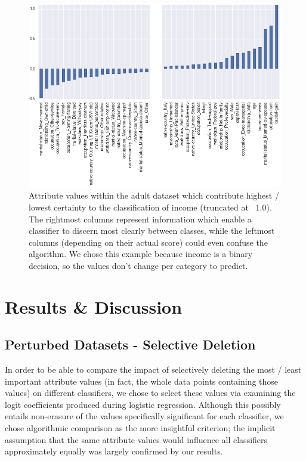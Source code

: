 \documentclass{llncs}
\begin{document}
\begin{figure}[h]
	\begin{center}
    	\hspace*{-0.8cm}
		\includegraphics[width=1.1\textwidth]{figures/theory/important_columns_income_truncated}
		\caption{Attribute values within the adult dataset which contribute highest / lowest certainty to the classification of income (truncated at ~1.0). The rightmost columns represent information which enable a classifier to discern most clearly between classes, while the leftmost columns (depending on their actual score) could even confuse the algorithm. We chose this example because income is a binary decision, so the values don't change per category to predict.}
		\label{fig:adult_important_columns}
	\end{center}
\end{figure}



\section{Results \& Discussion}
\label{sect:results}


\subsection{Perturbed Datasets - Selective Deletion}
\label{ssect:selective_deletion}

In order to be able to compare the impact of selectively deleting the most / least important attribute values (in fact, the whole data points containing those values) on different classifiers, we chose to select these values via examining the logit coefficients produced during logistic regression. Although this possibly entails non-erasure of the values specifically significant for each classifier, we chose algorithmic comparison as the more insightful criterion; the implicit assumption that the same attribute values would influence all classifiers approximately equally was largely confirmed by our results.
\end{document}
